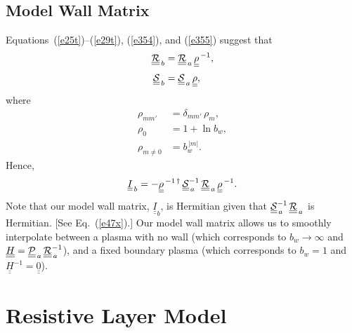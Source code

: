 \documentclass[12pt,prb,aps]{revtex4-1}
\begin{document}
\subsection{Model Wall Matrix}
 Equations~(\ref{e25t})--(\ref{e29t}), (\ref{e354}), and (\ref{e355}) suggest that
 \begin{align}
 \underline{\underline{{\cal R}}}_{\,b}& = \underline{\underline{{\cal R}}}_{\,a} \,\underline{\underline{\rho}}^{\,-1},\\[0.5ex]
 \underline{\underline{{\cal S}}}_{\,b} &= \underline{\underline{{\cal S}}}_{\,a} \,\underline{\underline{\rho}},
 \end{align}
 where
 \begin{align}
 \rho_{mm'} &= \delta_{mm'}\,\rho_m,\\[0.5ex]
 \rho_0 &= 1+\ln b_w,\\[0.5ex]
 \rho_{m\neq 0} &= b_w^{\,|m|}.
 \end{align}
 Hence,
 \begin{equation}
 \underline{\underline{I}}_{\,b}= - \underline{\underline{\rho}}^{\,-1\,\dag}\,\underline{\underline{\cal S}}_{\,a}^{-1}\,\underline{\underline{\cal R}}_{\,a}\,\underline{\underline{\rho}}^{\,-1}.
 \end{equation}
 Note that our model wall matrix, $\underline{\underline{I}}_b$, is Hermitian given that $\underline{\underline{\cal S}}_{\,a}^{-1}\,\underline{\underline{\cal R}}_{\,a}$
 is Hermitian. [See Eq.~(\ref{e47x}).] Our model wall matrix allows us to smoothly interpolate between a plasma with no wall
 (which corresponds to $b_w\rightarrow\infty$ and $\underline{\underline{H}}= \underline{\underline{\cal P}}_{\,a}\,\underline{\underline{\cal R}}_{\,a}^{-1}$),\cite{tj}
 and a fixed boundary plasma (which corresponds to $b_w=1$ and $\underline{\underline{H}}^{-1}= \underline{\underline{0}}$). 

\section{Resistive Layer Model}\label{lmodel}
\end{document}
